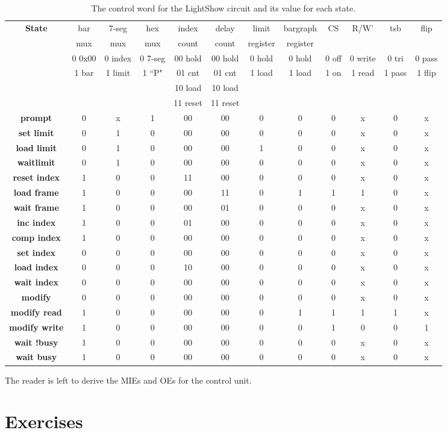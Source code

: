 \begin{table}
{\tiny
\begin{tabular}{c||c|c|c|c|c|c|c|c|c|c|c}
{\bf State } 	& bar & 7-seg & hex & index & delay & limit    & bargraph & CS & R/W' & tsb & flip \\  
	& mux & mux   & mux & count & count & register & register &       &       & &      \\  \hline \hline
	& 0 0x00 & 0 index & 0 7-seg & 00 hold & 00 hold & 0 hold & 0 hold & 0 off & 0 write & 0 tri & 0 pass \\ 
	& 1 bar	& 1 limit & 1 ``P"& 01 cnt & 01 cnt & 1 load &    1 load & 1 on    &  1 read & 1 pass & 1 flip \\
	& 	&     &     & 10 load & 10 load & & & & & \\
	& 	&     &	    & 11 reset	& 11 reset & & & & \\ \hline \hline
{\bf prompt } 	 & 	0 &	x &	1 &	00 &	00 &	0 &	0 &	0 & x &	0 & x \\ \hline
{\bf set limit }  & 	0 &	1 &	0 &	00 &	00 &	0 &	0 &	0 & x &	0 & x \\ \hline
{\bf load limit } &	0 &	1 &	0 &	00 &	00 &	1 &	0 &	0 & x &	0 & x \\ \hline
{\bf waitlimit } &	0 &	1 &	0 &	00 &	00 &	0 &	0 &	0 & x &	0 & x \\ \hline
{\bf reset index } &	1 &	0 & 	0 &	11 &	00 &	0 &	0 &	0 & x &	0 & x \\ \hline
{\bf load frame } &	1 &	0 &	0 &	00 &	11 &	0 &	1 &	1 & 1 & 0 & x \\ \hline
{\bf wait frame } &	1 &	0 &	0 &	00 &	01 &	0 &	0 &	0 & x &	0 & x \\ \hline
{\bf inc index } &	1 &	0 &	0 &	01 &	00 &	0 &	0 &	0 & x &	0 & x \\ \hline
{\bf comp index } &	1 &	0 &	0 &	00 &	00 &	0 &	0 &	0 & x &	0 & x \\ \hline
{\bf set index } &	0 &	0 &	0 &	00 & 	00 &	0 & 	0 &	0 & x &	0 & x \\ \hline
{\bf load index } &	0 &	0 & 	0 &	10 &	00 &	0 &	0 &	0 & x & 0 & x \\ \hline
{\bf wait index } &	0 &	0 &	0 &	00 &	00 &	0 &	0 &	0 & x &	0 & x \\ \hline
{\bf modify	} &	0 &	0 &	0 &	00 &	00 &	0 &	0 &	0 & x &	0 & x \\ \hline
{\bf modify read} &	1 &	0 &	0 &	00 &	00 &	0 &	1 &	1 & 1 &	1 & x \\ \hline
{\bf modify write } &	1 &	0 &	0 &	00 &	00 &	0 &	0 & 	1 & 0 &	0 & 1 \\ \hline
{\bf wait !busy } &	1 &	0 &	0 &	00 &	00 &	0 &	0 &	0 & x &	0 & x \\ \hline
{\bf wait busy } &	1 &	0 &	0 &	00 &	00 &	0 &	0 &	0 & x &	0 & x \\ 
\end{tabular} 
}
\caption{The control word for the LightShow circuit and its value for each state.}
\label{table:LightShow}
\end{table}

The reader is left to derive the MIEs and OEs for the control unit.
\section{Exercises}


